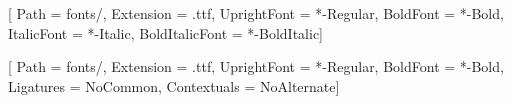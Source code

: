 
\usepackage{booktabs}
\usepackage{colortbl}

\newfontfamily{}[
  Path = fonts/, Extension = .ttf,
  UprightFont = *-Regular, BoldFont = *-Bold,
  ItalicFont  = *-Italic,  BoldItalicFont = *-BoldItalic]

\newfontfamily{}[
  Path = fonts/, Extension = .ttf,
  UprightFont = *-Regular, BoldFont = *-Bold,
  Ligatures = NoCommon, Contextuals = NoAlternate]
\let\FiraCode\FiraCodeNL

\lstset{mathescape=false}

\gdef\documentlsttitle{Elenco dei listati}
\gdef\documentlstlabel{Listato}


